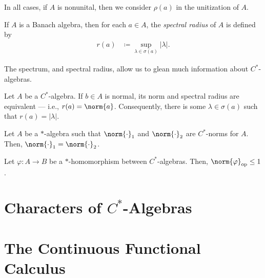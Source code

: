 \begin{remark}
  In all cases, if $A$ is nonunital, then we consider $\rho\left( a \right)$ in the unitization of $A$.
\end{remark}
\begin{definition}{\cite[Definition 7.3.5]{rainone_analysis}}
  If $A$ is a Banach algebra, then for each $a\in A$, the \textit{spectral radius} of $A$ is defined by
  \begin{align*}
    r(a) &\coloneq \sup_{\lambda\in \sigma\left( a \right)}\left\vert \lambda \right\vert.
  \end{align*}
\end{definition}
The spectrum, and spectral radius, allow us to glean much information about $C^{\ast}$-algebras.
\begin{proposition}
  Let $A$ be a $C^{\ast}$-algebra. If $b\in A$ is normal, its norm and spectral radius are equivalent --- i.e., $r(a) =\norm{a} $. Consequently, there is some $\lambda\in \sigma\left( a \right)$ such that $r(a) = \left\vert \lambda \right\vert$.
\end{proposition}
\begin{proposition}
  Let $A$ be a ${\ast}$-algebra such that $\norm{\cdot}_1$ and $\norm{\cdot}_2$ are $C^{\ast}$-norms for $A$. Then, $\norm{\cdot}_1 = \norm{\cdot}_2$.
\end{proposition}
\begin{proposition}
  Let $\varphi\colon A\rightarrow B$ be a $\ast$-homomorphism between $C^{\ast}$-algebras. Then, $\norm{\varphi}_{\op}\leq 1$.
\end{proposition}
\section{Characters of \texorpdfstring{$C^{\ast}$-Algebras}{C*-Algebras}}%
\section{The Continuous Functional Calculus}%
